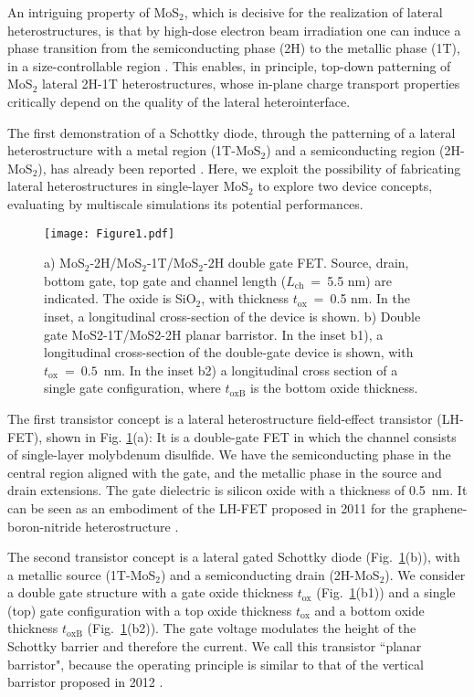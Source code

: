 \documentclass[aps,reprint,superscriptaddress,secnumarabic,amssymb,showpacs]{revtex4-1}
\begin{document}
An intriguing property of MoS$_2$, which is decisive for the realization of lateral heterostructures, is that by high-dose electron beam irradiation one can induce a phase transition from the semiconducting phase (2H) to the metallic phase (1T), in a size-controllable region \cite{Lin2014}. This enables, in principle, top-down patterning of MoS$_2$ lateral 2H-1T heterostructures, whose in-plane charge transport properties critically depend on the quality of the lateral heterointerface.

The first demonstration of a Schottky diode, through the patterning of a lateral heterostructure with a metal region (1T-MoS$_2$) and a semiconducting region (2H-MoS$_2$), has already been reported \cite{Cusati2016}. 
Here, we exploit the possibility of fabricating lateral heterostructures in single-layer MoS$_2$ to explore two device concepts, evaluating by multiscale simulations its potential performances.

\begin{figure} [h!!!]
\texttt{[image: Figure1.pdf]}
\caption{a) MoS$_2$-2H/MoS$_2$-1T/MoS$_2$-2H double gate FET. Source, drain, bottom gate, top gate and channel length ($L_{\text{ch}}$~=~5.5 nm) are indicated. The oxide is SiO$_2$, with thickness $t_{\text{ox}}$~=~0.5 nm. In the inset, a longitudinal cross-section of the device is shown. b) Double gate MoS2-1T/MoS2-2H planar barristor. In the inset b1), a longitudinal cross-section of the double-gate device is shown, with $t_{\text{ox}}~=~0.5$~nm. In the inset b2) a longitudinal cross section of a single gate configuration, where $t_\text{oxB}$ is the bottom oxide thickness.}
\label{fig:Fig2}
\end{figure}

The first transistor concept is a lateral heterostructure field-effect transistor (LH-FET), shown in Fig. \ref{fig:Fig2}(a): It is a double-gate FET in which the channel consists of single-layer molybdenum disulfide. We have the semiconducting phase in the central region aligned with the gate, and the metallic phase in the source and drain extensions. The gate dielectric is silicon oxide with a thickness of 0.5~nm. It can be seen as an embodiment of the LH-FET proposed in 2011 for the graphene-boron-nitride heterostructure \cite{Fiori2011,Fiori2012}.

The second transistor concept is a lateral gated Schottky diode (Fig.~\ref{fig:Fig2}(b)), with a metallic source (1T-MoS$_2$) and a semiconducting drain (2H-MoS$_2$). We consider a double gate structure with a gate oxide thickness $t_{\text{ox}}$ (Fig.~\ref{fig:Fig2}(b1)) and a single (top) gate configuration with a top oxide thickness $t_{\text{ox}}$ and a bottom oxide thickness $t_\text{oxB}$ (Fig.~\ref{fig:Fig2}(b2)). The gate voltage modulates the height of the Schottky barrier and therefore the current. We call this transistor ``planar barristor", because the operating principle is similar to that of the vertical barristor proposed in 2012 \cite{Yang2012}.
\end{document}
